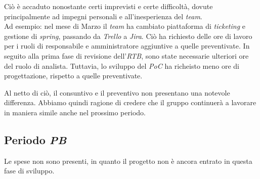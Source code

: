 \documentclass[5pt]{article}
\begin{document}
    Ciò è accaduto nonostante certi imprevisti e certe difficoltà, dovute principalmente ad impegni personali e all'inesperienza del \textit{team}. \\
    Ad esempio: nel mese di Marzo il \textit{team} ha cambiato piattaforma di \textit{ticketing} e gestione di \textit{spring}, passando da \textit{Trello} a \textit{Jira}.
    Ciò ha richiesto delle ore di lavoro per i ruoli di responsabile e amministratore aggiuntive a quelle preventivate.
    In seguito alla prima fase di revisione dell'\textit{RTB}, sono state necessarie ulteriori ore del ruolo di analista.
    Tuttavia, lo sviluppo del \textit{PoC} ha richeisto meno ore di progettazione, rispetto a quelle preventivate.


    Al netto di ciò, il consuntivo e il preventivo non presentano una notevole differenza. Abbiamo quindi ragione di credere che il gruppo continuerà 
    a lavorare in maniera simile anche nel prossimo periodo.

  \subsection{Periodo \textit{PB}}
    Le spese non sono presenti, in quanto il progetto non è ancora entrato in questa fase di sviluppo.
\end{document}
